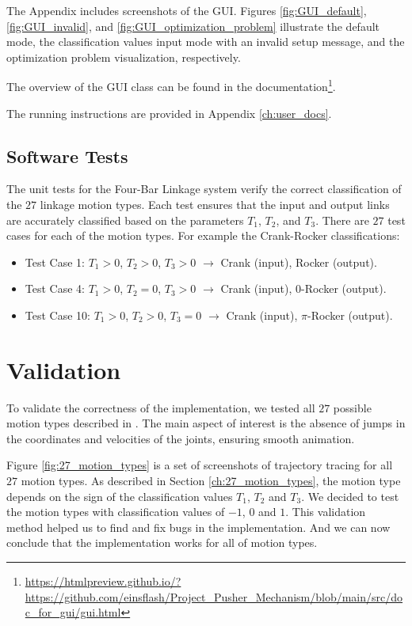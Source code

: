 \documentclass{article}
\begin{document}
The Appendix includes screenshots of the GUI. Figures \ref{fig:GUI_default}, \ref{fig:GUI_invalid}, and \ref{fig:GUI_optimization_problem} illustrate the default mode, the classification values input mode with an invalid setup message, and the optimization problem visualization, respectively.

The overview of the GUI class can be found in the documentation\footnote{\url{https://htmlpreview.github.io/?https://github.com/einsflash/Project_Pusher_Mechanism/blob/main/src/doc_for_gui/gui.html}}.

The running instructions are provided in Appendix \ref{ch:user_docs}.

\subsection{Software Tests}

The unit tests for the Four-Bar Linkage system verify the correct classification of the $27$ linkage motion types. Each test ensures that the input and output links are accurately classified based on the parameters $T_1$, $T_2$, and $T_3$. There are $27$ test cases for each of the motion types. For example the Crank-Rocker classifications:

\begin{itemize}
	\item Test Case 1: $T_1 > 0$, $T_2 > 0$, $T_3 > 0$ $\rightarrow$ Crank (input), Rocker (output).
	\item Test Case 4: $T_1 > 0$, $T_2 = 0$, $T_3 > 0$ $\rightarrow$ Crank (input), 0-Rocker (output).
	\item Test Case 10: $T_1 > 0$, $T_2 > 0$, $T_3 = 0$ $\rightarrow$ Crank (input), \(\pi\)-Rocker (output).
\end{itemize}

\section{Validation}\label{ch:validation}

To validate the correctness of the implementation, we tested all $27$ possible motion types described in \cite{inproceedings}. The main aspect of interest is the absence of jumps in the coordinates and velocities of the joints, ensuring smooth animation. 

Figure \ref{fig:27_motion_types} is a set of screenshots of trajectory tracing for all $27$ motion types. As described in Section \ref{ch:27_motion_types}, the motion type depends on the sign of the classification values $T_1$, $T_2$ and $T_3$. We decided to test the motion types with classification values of $-1$, $0$ and $1$. This validation method helped us to find and fix bugs in the implementation. And we can now conclude that the implementation works for all of motion types.
\end{document}
